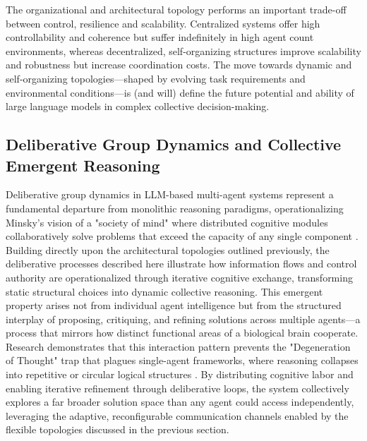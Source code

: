 \documentclass[11pt,a4paper]{article}
\begin{document}
The organizational and architectural topology performs an important trade-off between control, resilience and scalability. Centralized systems offer high controllability and coherence but suffer indefinitely in high agent count environments, whereas decentralized, self-organizing structures improve scalability and robustness but increase coordination costs. The move towards dynamic and self-organizing topologies---shaped by evolving task requirements and environmental conditions---is (and will) define the future potential and ability of large language models in complex collective decision-making.


\subsection{Deliberative Group Dynamics and Collective Emergent Reasoning}


Deliberative group dynamics in LLM-based multi-agent systems represent a fundamental departure from monolithic reasoning paradigms, operationalizing Minsky's vision of a "society of mind" where distributed cognitive modules collaboratively solve problems that exceed the capacity of any single component \cite{arxiv:2404.02183v1}. Building directly upon the architectural topologies outlined previously, the deliberative processes described here illustrate how information flows and control authority are operationalized through iterative cognitive exchange, transforming static structural choices into dynamic collective reasoning. This emergent property arises not from individual agent intelligence but from the structured interplay of proposing, critiquing, and refining solutions across multiple agents---a process that mirrors how distinct functional areas of a biological brain cooperate. Research demonstrates that this interaction pattern prevents the "Degeneration of Thought" trap that plagues single-agent frameworks, where reasoning collapses into repetitive or circular logical structures \cite{arxiv:2404.04834v1}. By distributing cognitive labor and enabling iterative refinement through deliberative loops, the system collectively explores a far broader solution space than any agent could access independently, leveraging the adaptive, reconfigurable communication channels enabled by the flexible topologies discussed in the previous section.
\end{document}
